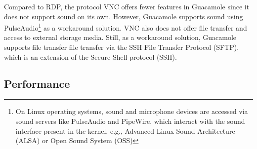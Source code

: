 \documentclass[runningheads]{llncs}
\begin{document}
Compared to RDP, the protocol VNC offers fewer features in Guacamole since it does not support sound on its own. However, Guacamole supports sound using PulseAudio\footnote{On Linux operating systems, sound and microphone devices are accessed via sound servers like PulseAudio and PipeWire, which interact with the sound interface present in the kernel, e.g., Advanced Linux Sound Architecture (ALSA) or Open Sound System (OSS)} as a workaround solution. VNC also does not offer file transfer and access to external storage media. Still, as a workaround solution, Guacamole supports file transfer file transfer via the SSH File Transfer Protocol (SFTP), which is an extension of the Secure Shell protocol (SSH).




\subsection{Performance}
%
%
\end{document}

